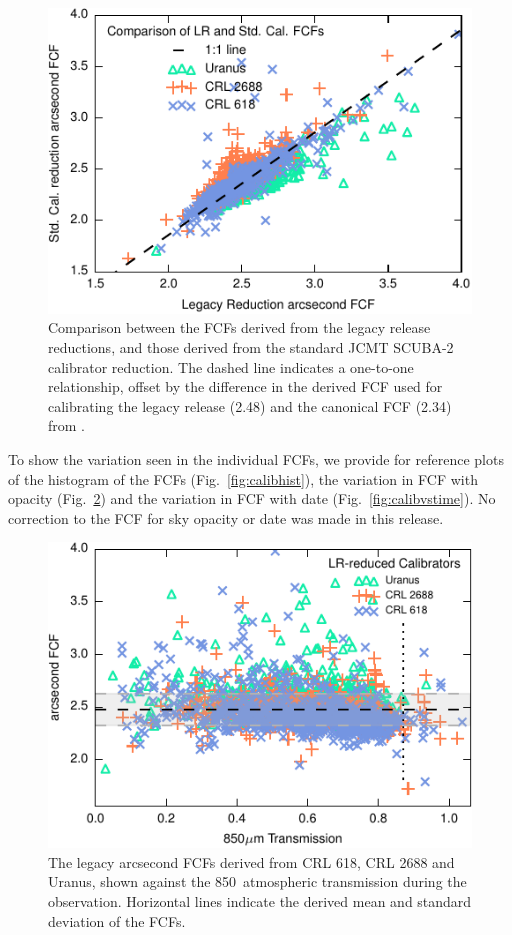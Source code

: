 \documentclass[twocolumn,times]{aastex6}
\begin{document}
\begin{figure}
\includegraphics{legacyFCF-caldbFCF-scatter.pdf}
\caption{Comparison between the FCFs derived from the legacy release
  reductions, and those derived from the standard JCMT SCUBA-2
  calibrator reduction. The dashed line indicates a one-to-one
  relationship, offset by the difference in the derived FCF used for
  calibrating the legacy release (2.48) and the canonical FCF (2.34)
  from \citet{Dempsey2013}. \label{fig:lr-caldb-scatter} }
\end{figure}


To show the variation seen in the individual FCFs, we provide for
reference plots of the histogram of the FCFs
(Fig.~\ref{fig:calibhist}), the variation in FCF with opacity
(Fig.~\ref{fig:calibvstrans}) and the variation in FCF with date
(Fig.~\ref{fig:calibvstime}). No correction to the FCF for sky opacity or date
was made in this release.

\begin{figure}
\includegraphics{legacyFCF-vs-transmission.pdf}
\caption{The legacy arcsecond FCFs derived from CRL 618, CRL 2688 and
  Uranus, shown against the 850\micron\ atmospheric transmission
  during the observation. Horizontal lines indicate the derived mean
  and standard deviation of the FCFs.\label{fig:calibvstrans}}
\end{figure}
\end{document}
